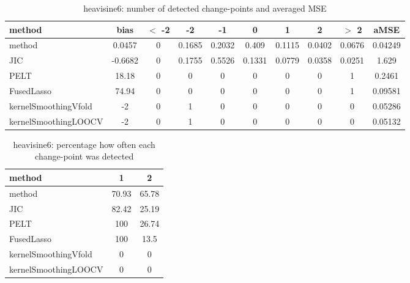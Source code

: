 \begin{table}[ht]
\centering
\begin{tabular}{l|c|ccccccc|c}
  \hline
method & bias & $<$ -2 & -2 & -1 & 0 & 1 & 2 & $>$ 2 & aMSE \\ 
  \hline
method & 0.0457 &     0 & 0.1685 & 0.2032 & 0.409 & 0.1115 & 0.0402 & 0.0676 & 0.04249 \\ 
  JIC & -0.6682 &     0 & 0.1755 & 0.5526 & 0.1331 & 0.0779 & 0.0358 & 0.0251 & 1.629 \\ 
  PELT & 18.18 &     0 &     0 &     0 &     0 &     0 &     0 &     1 & 0.2461 \\ 
  FusedLasso & 74.94 &     0 &     0 &     0 &     0 &     0 &     0 &     1 & 0.09581 \\ 
  kernelSmoothingVfold &    -2 &     0 &     1 &     0 &     0 &     0 &     0 &     0 & 0.05286 \\ 
  kernelSmoothingLOOCV &    -2 &     0 &     1 &     0 &     0 &     0 &     0 &     0 & 0.05132 \\ 
   \hline
\end{tabular}
\caption{heavisine6: number of detected change-points and averaged MSE} 
\label{tab:heavisine6Njumps}
\end{table}
\begin{table}[ht]
\centering
\begin{tabular}{l|cc}
  \hline
method & 1 & 2 \\ 
  \hline
method &  70.93 &  65.78 \\ 
  JIC &  82.42 &  25.19 \\ 
  PELT &    100 &  26.74 \\ 
  FusedLasso &    100 &   13.5 \\ 
  kernelSmoothingVfold &      0 &      0 \\ 
  kernelSmoothingLOOCV &      0 &      0 \\ 
   \hline
\end{tabular}
\caption{heavisine6: percentage how often each change-point was detected} 
\label{tab:heavisine6Detections}
\end{table}

